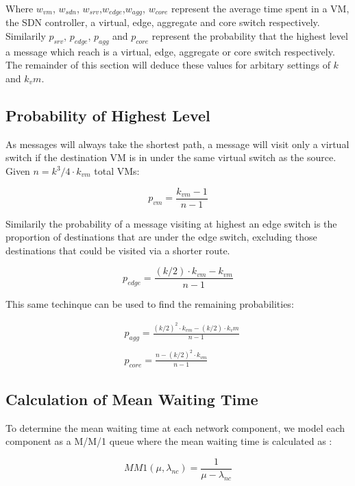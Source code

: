 Where $w_{vm}$, $w_{sdn}$, $w_{srv}$,$w_{edge}$,$w_{agg}$, $w_{core}$ represent the average time spent in a VM, the SDN controller, a virtual, edge, aggregate and core switch respectively. Similarily $p_{srv}$, $p_{edge}$, $p_{agg}$ and $p_{core}$ represent the probability that the highest level a message which reach is a virtual, edge, aggregate or core switch respectively. The remainder of this section will deduce these values for arbitary settings of $k$ and $k_vm$.

\subsection{Probability of Highest Level}
As messages will always take the shortest path, a message will visit only a virtual switch if the destination VM is in under the same virtual switch as the source. Given $n=k^3/4 \cdot k_{vm}$ total VMs:

\begin{equation}
p_{vm} = \frac{k_{vm} - 1}{n - 1}
\end{equation}

Similarily the probability of a message visiting at highest an edge switch is the proportion of destinations that are under the edge switch, excluding those destinations that could be visited via a shorter route.

\begin{equation}
p_{edge} = \frac{(k/2) \cdot k_{vm} - k_{vm}}{n - 1}
\end{equation}

This same techinque can be used to find the remaining probabilities:

\begin{align}
&p_{agg} = \frac{(k/2)^2 \cdot k_{vm} - (k/2) \cdot k_vm}{n - 1} \\ \nonumber \\
&p_{core} = \frac{n - (k/2)^2 \cdot k_{vm}}{n - 1}
\end{align}

\subsection{Calculation of Mean Waiting Time}
To determine the mean waiting time at each network component, we model each component as a M/M/1 queue where the mean waiting time is calculated as \cite{}:

\begin{equation}
\label{eq:MM1_time_in_network}
MM1(\mu, \lambda_{nc}) = \frac{1}{\mu - \lambda_{nc}}
\end{equation}

